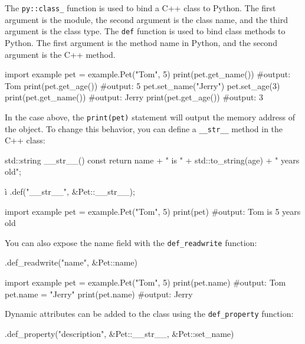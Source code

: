 The \texttt{py::class\_} function is used to bind a C++ class to Python. The first argument is the module, the second argument is the class name, and the third argument is the class type. The \texttt{def} function is used to bind class methods to Python. The first argument is the method name in Python, and the second argument is the C++ method.

\begin{codeblock}[language=python]
import example
pet = example.Pet("Tom", 5)
print(pet.get_name()) #output: Tom
print(pet.get_age()) #output: 5
pet.set_name("Jerry")
pet.set_age(3)
print(pet.get_name()) #output: Jerry
print(pet.get_age()) #output: 3
\end{codeblock}

In the case above, the \texttt{print(pet)} statement will output the memory address of the object. To change this behavior, you can define a \texttt{\_\_str\_\_} method in the C++ class:

\begin{codeblock}[language=C++]
std::string __str__() const {
    return name + " is " + std::to_string(age) + " years old";
}
\end{codeblock}

\begin{codeblock}[language=C++]ì
.def("__str__", &Pet::__str__);
\end{codeblock}

\begin{codeblock}[language=python]
import example
pet = example.Pet("Tom", 5)
print(pet) #output: Tom is 5 years old
\end{codeblock}

You can also expose the name field with the \texttt{def\_readwrite} function:

\begin{codeblock}[language=C++]
.def_readwrite("name", &Pet::name)
\end{codeblock}

\begin{codeblock}[language=python]
import example
pet = example.Pet("Tom", 5)
print(pet.name) #output: Tom
pet.name = "Jerry"
print(pet.name) #output: Jerry
\end{codeblock}

Dynamic attributes can be added to the class using the \texttt{def\_property} function:

\begin{codeblock}[language=C++]
.def_property("description", &Pet::__str__, &Pet::set_name)
\end{codeblock}

